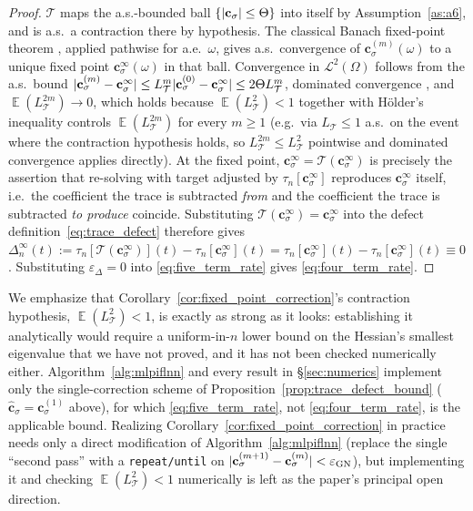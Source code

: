 \documentclass[11pt, a4paper]{article}
\theoremstyle{theoremstyle}
\theoremstyle{definitionstyle}
\DeclareMathOperator{\EE}{\mathbb E}
\DeclarePairedDelimiter{\abs}{\lvert}{\rvert}
\begin{document}
\begin{proof}
    $\mathcal T$ maps the a.s.-bounded ball $\{\abs{\mathbf c_\sigma}\le\Theta\}$ into itself by Assumption~\ref{as:a6}, and is a.s.\ a contraction there by hypothesis. The classical Banach fixed-point theorem \cite{rudin1976principles}, applied pathwise for a.e.\ $\omega$, gives a.s.\ convergence of $\mathbf c_\sigma^{(m)}(\omega)$ to a unique fixed point $\mathbf c_\sigma^\infty(\omega)$ in that ball. Convergence in $\mathcal L^2(\Omega)$ follows from the a.s.\ bound $\abs{\mathbf c_\sigma^{(m)}-\mathbf c_\sigma^\infty} \le L_\mathcal T^m\abs{\mathbf c_\sigma^{(0)}-\mathbf c_\sigma^\infty} \le 2\Theta L_\mathcal T^m$, dominated convergence \cite{folland1999real}, and $\EE(L_\mathcal T^{2m})\to 0$, which holds because $\EE(L_\mathcal T^2)<1$ together with H\"older's inequality controls $\EE(L_\mathcal T^{2m})$ for every $m\ge 1$ (e.g.\ via $L_\mathcal T\le 1$ a.s.\ on the event where the contraction hypothesis holds, so $L_\mathcal T^{2m}\le L_\mathcal T^2$ pointwise and dominated convergence applies directly). At the fixed point, $\mathbf c_\sigma^\infty = \mathcal T(\mathbf c_\sigma^\infty)$ is precisely the assertion that re-solving with target adjusted by $\tau_n[\mathbf c_\sigma^\infty]$ reproduces $\mathbf c_\sigma^\infty$ itself, i.e.\ the coefficient the trace is subtracted \emph{from} and the coefficient the trace is subtracted \emph{to produce} coincide. Substituting $\mathcal T(\mathbf c_\sigma^\infty) = \mathbf c_\sigma^\infty$ into the defect definition~\eqref{eq:trace_defect} therefore gives $\Delta_n^\infty(t) := \tau_n[\mathcal T(\mathbf c_\sigma^\infty)](t) - \tau_n[\mathbf c_\sigma^\infty](t) = \tau_n[\mathbf c_\sigma^\infty](t) - \tau_n[\mathbf c_\sigma^\infty](t) \equiv 0$. Substituting $\varepsilon_\Delta = 0$ into \eqref{eq:five_term_rate} gives \eqref{eq:four_term_rate}.
\end{proof}

We emphasize that Corollary~\ref{cor:fixed_point_correction}'s contraction hypothesis, $\EE(L_\mathcal T^2)<1$, is exactly as strong as it looks: establishing it analytically would require a uniform-in-$n$ lower bound on the Hessian's smallest eigenvalue that we have not proved, and it has not been checked numerically either. Algorithm~\ref{alg:mlpiflnn} and every result in \S\ref{sec:numerics} implement only the single-correction scheme of Proposition~\ref{prop:trace_defect_bound} ($\hat{\mathbf c}_\sigma = \mathbf c_\sigma^{(1)}$ above), for which \eqref{eq:five_term_rate}, not \eqref{eq:four_term_rate}, is the applicable bound. Realizing Corollary~\ref{cor:fixed_point_correction} in practice needs only a direct modification of Algorithm~\ref{alg:mlpiflnn} (replace the single ``second pass'' with a \texttt{repeat/until} on $\abs{\mathbf c_\sigma^{(m+1)}-\mathbf c_\sigma^{(m)}}<\varepsilon_{\mathrm{GN}}$), but implementing it and checking $\EE(L_\mathcal T^2)<1$ numerically is left as the paper's principal open direction.
\end{document}
